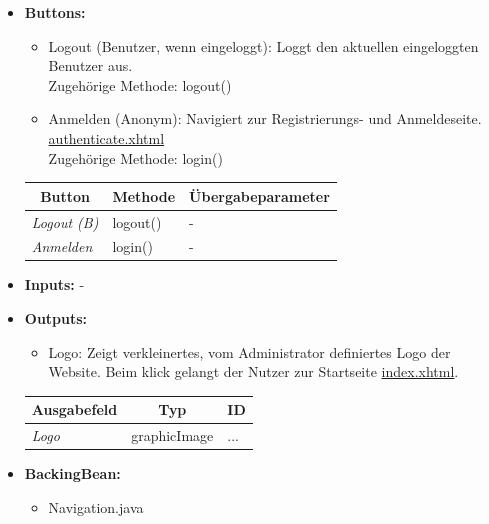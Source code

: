 \begin{itemize}
			\item \textbf{Buttons:}
				\begin{itemize}
					\item Logout (Benutzer, wenn eingeloggt): Loggt den aktuellen eingeloggten Benutzer aus. \\ Zugehörige Methode: logout()
					\item Anmelden (Anonym): Navigiert zur Registrierungs- und Anmeldeseite. \hyperlink{authenticate}{authenticate.xhtml} \\ Zugehörige Methode: login()
				\end{itemize}
				\begin{center}
					\begin{longtable}{|p{4cm} |p{4cm} | p{4cm}|}
					
						\hline \multicolumn{1}{|c|}{\textbf{Button}} & \multicolumn{1}{|c|}{\textbf{Methode}} & \multicolumn{1}{|c|}{\textbf{\"{U}bergabeparameter}} \\ \hline
						\endfirsthead
						\hline
						\endlastfoot
					
							\textit{Logout (B)} & logout() & - \\ \hline
							\textit{Anmelden} & login() & - \\ \hline
					\end{longtable}
				\end{center}
			\item \textbf{Inputs:} -
			\item \textbf{Outputs:}
				\begin{itemize}
					\item Logo: Zeigt verkleinertes, vom Administrator definiertes Logo der Website. Beim klick gelangt der Nutzer zur Startseite \hyperlink{index}{index.xhtml}.
				\end{itemize}
				\begin{center}
					\begin{longtable}{|p{5cm} | p{4cm}|p{3cm}|}
						
						\hline \multicolumn{1}{|c|}{\textbf{Ausgabefeld}} & \multicolumn{1}{|c|}{\textbf{Typ}}  &  \multicolumn{1}{|c|}{\textbf{ID}} \\ \hline
						\endfirsthead
						\hline
						\endlastfoot
						\textit{Logo}  & graphicImage & ... \\ \hline
					\end{longtable}
				\end{center}
			\item \textbf{BackingBean:}
				\begin{itemize}
					\item Navigation.java
				\end{itemize}
		\end{itemize}
		
